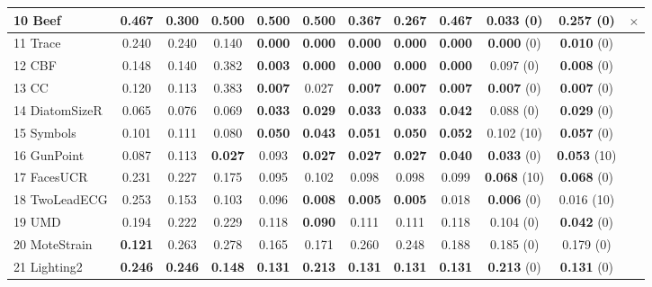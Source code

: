 \begin{table}[h!]
{\begin{tabular}{|l|ccccc|ccc|ccc|}
			10 Beef                & 0.467 & 0.300 & 0.500 & 0.500 & 0.500     & 0.367 & 0.267 & 0.467 & \textbf{0.033} (0) & 0.257 (0) & $\times$   \\	
			\hline		
			11 Trace               & 0.240 & 0.240 & 0.140 & \textbf{0.000}    & \textbf{0.000}        & \textbf{0.000} & \textbf{0.000} & \textbf{0.000} & \textbf{0.000} (0)    & \textbf{0.010} (0)  & \checkmark \\	
			12 CBF                 & 0.148 & 0.140 & 0.382 & \textbf{0.003} & \textbf{0.000}        & \textbf{0.000} & \textbf{0.000} & \textbf{0.000} & 0.097 (0) & \textbf{0.008} (0)  & \checkmark \\										
			13 CC                  & 0.120 & 0.113 & 0.383 & \textbf{0.007} & 0.027     & \textbf{0.007} & \textbf{0.007} & \textbf{0.007} &\textbf{0.007} (0) & \textbf{0.007} (0) & \checkmark \\		
			14 DiatomSizeR     	& 0.065 & 0.076 & 0.069 & \textbf{0.033} & \textbf{0.029}     & \textbf{0.033} & \textbf{0.033} & \textbf{0.042} & 0.088 (0)  & \textbf{0.029} (0) & \checkmark \\			
			15 Symbols             & 0.101 & 0.111 & 0.080 & \textbf{0.050} & \textbf{0.043}     & \textbf{0.051} & \textbf{0.050} & \textbf{0.052} & 0.102 (10) & \textbf{0.057} (0) & \checkmark \\
			16 GunPoint            & 0.087 & 0.113 & \textbf{0.027} & 0.093 & \textbf{0.027}     & \textbf{0.027} & \textbf{0.027} & \textbf{0.040} & \textbf{0.033} (0) & \textbf{0.053} (10) & \checkmark \\
			17 FacesUCR            & 0.231 & 0.227 & 0.175 & 0.095 & 0.102     & 0.098 & 0.098 & 0.099 & \textbf{0.068}  (10) & \textbf{0.068} (0) & \checkmark \\
			18 TwoLeadECG          & 0.253 & 0.153 & 0.103 & 0.096 & \textbf{0.008}   & \textbf{0.005} & \textbf{0.005} & 0.018 & \textbf{0.006} (0)  & 0.016 (10) & \checkmark \\	
			19 UMD 		& 0.194 & 0.222 & 0.229 & 0.118 & \textbf{0.090} & 0.111 & 0.111 & 0.118 & 0.104  (0) & \textbf{0.042} (0) & \checkmark \\ 			
			20 MoteStrain          & \textbf{0.121} & 0.263& 0.278 & 0.165& 0.171     & 0.260 & 0.248 & 0.188 & 0.185 (0)  & 0.179 (0) & \checkmark \\						
			21 Lighting2           & \textbf{0.246} & \textbf{0.246} & \textbf{0.148} & \textbf{0.131} & \textbf{0.213} & \textbf{0.131} & \textbf{0.131} & \textbf{0.131} & \textbf{0.213} (0)  & \textbf{0.131} (0) & \checkmark \\

\end{tabular}}
\end{table}
